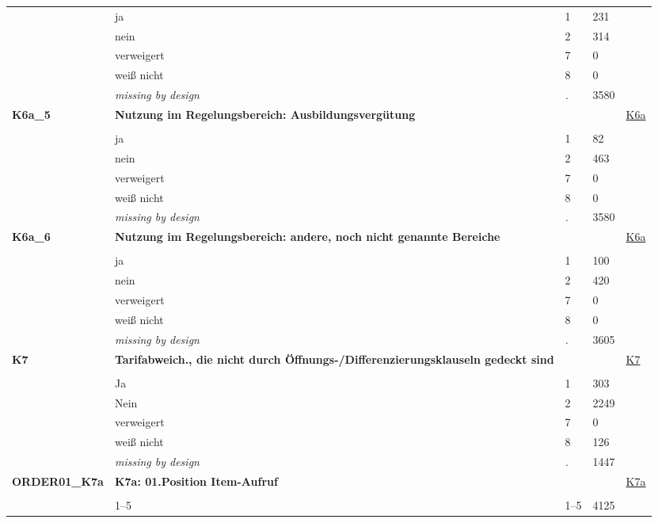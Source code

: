 \begin{longtable}{| L{2.65cm} | L{8cm} | C{1.5cm} | R{1.25cm} | C{2.25cm}  |}
   & ja & 1 & 231 &  \\ 
   & nein & 2 & 314 &  \\ 
   & verweigert & 7 & 0 &  \\ 
   & weiß nicht & 8 & 0 &  \\ 
   & \textit{missing by design} & \textit{.} & 3580 &  \\ 
   \midrule
\textbf{K6a\_5}\label{var:K6a:5} & \textbf{Nutzung im Regelungsbereich: Ausbildungsvergütung} &  &  & \hyperref[K6a]{K6a} \\ 
   &  &  &  &  \\ 
   & ja & 1 & 82 &  \\ 
   & nein & 2 & 463 &  \\ 
   & verweigert & 7 & 0 &  \\ 
   & weiß nicht & 8 & 0 &  \\ 
   & \textit{missing by design} & \textit{.} & 3580 &  \\ 
   \midrule
\textbf{K6a\_6}\label{var:K6a:6} & \textbf{Nutzung im Regelungsbereich: andere, noch nicht genannte Bereiche} &  &  & \hyperref[K6a]{K6a} \\ 
   &  &  &  &  \\ 
   & ja & 1 & 100 &  \\ 
   & nein & 2 & 420 &  \\ 
   & verweigert & 7 & 0 &  \\ 
   & weiß nicht & 8 & 0 &  \\ 
   & \textit{missing by design} & \textit{.} & 3605 &  \\ 
   \midrule
\textbf{K7}\label{var:K7} & \textbf{Tarifabweich., die nicht durch Öffnungs-/Differenzierungsklauseln gedeckt sind} &  &  & \hyperref[K7]{K7} \\ 
   &  &  &  &  \\ 
   & Ja & 1 & 303 &  \\ 
   & Nein & 2 & 2249 &  \\ 
   & verweigert & 7 & 0 &  \\ 
   & weiß nicht & 8 & 126 &  \\ 
   & \textit{missing by design} & \textit{.} & 1447 &  \\ 
   \midrule
\textbf{ORDER01\_K7a}\label{var:ORDER01:K7a} & \textbf{K7a: 01.Position Item-Aufruf} &  &  & \hyperref[K7a]{K7a} \\ 
   &  &  &  &  \\ 
   & 1--5 & 1--5 & 4125 &  \\ 

\end{longtable}

